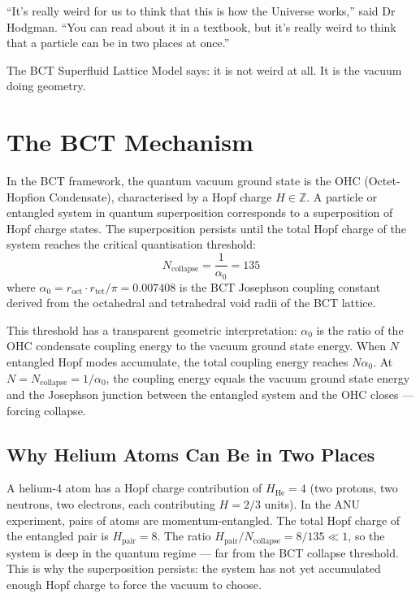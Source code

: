 \documentclass[aps,prl,twocolumn,showpacs,superscriptaddress]{revtex4-2}
\begin{document}
``It's really weird for us to think that this is how the Universe
works,'' said Dr Hodgman. ``You can read about it in a textbook,
but it's really weird to think that a particle can be in two places
at once.''

The BCT Superfluid Lattice Model says: it is not weird at all.
It is the vacuum doing geometry.

\section{The BCT Mechanism}

In the BCT framework, the quantum vacuum ground state is the OHC
(Octet-Hopfion Condensate), characterised by a Hopf charge
$H \in \mathbb{Z}$. A particle or entangled system in quantum
superposition corresponds to a superposition of Hopf charge states.
The superposition persists until the total Hopf charge of the
system reaches the critical quantisation threshold:
\begin{equation}
N_\mathrm{collapse} = \frac{1}{\alpha_0} = 135
\end{equation}
where $\alpha_0 = r_\mathrm{oct} \cdot r_\mathrm{tet}/\pi = 0.007408$
is the BCT Josephson coupling constant derived from the octahedral
and tetrahedral void radii of the BCT lattice.

This threshold has a transparent geometric interpretation: $\alpha_0$
is the ratio of the OHC condensate coupling energy to the vacuum
ground state energy. When $N$ entangled Hopf modes accumulate,
the total coupling energy reaches $N\alpha_0$. At
$N = N_\mathrm{collapse} = 1/\alpha_0$, the coupling energy equals
the vacuum ground state energy and the Josephson junction between
the entangled system and the OHC closes --- forcing collapse.

\subsection*{Why Helium Atoms Can Be in Two Places}

A helium-4 atom has a Hopf charge contribution of $H_\mathrm{He} = 4$
(two protons, two neutrons, two electrons, each contributing
$H = 2/3$ units). In the ANU experiment, pairs of atoms are
momentum-entangled. The total Hopf charge of the entangled pair is
$H_\mathrm{pair} = 8$. The ratio $H_\mathrm{pair}/N_\mathrm{collapse}
= 8/135 \ll 1$, so the system is deep in the quantum regime --- far
from the BCT collapse threshold. This is why the superposition
persists: the system has not yet accumulated enough Hopf charge to
force the vacuum to choose.
\end{document}
